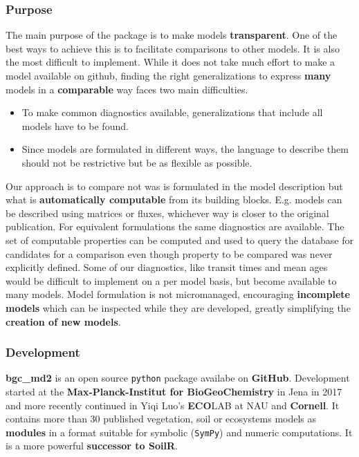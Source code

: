 \documentclass[36pt]{article}
\begin{document}
\begin{tcbposter}
{  \subsubsection*{Purpose}
  The main purpose of the package is to make models
  {\bf transparent}. One of the best ways to achieve this is to facilitate comparisons
  to other models. It is also the most difficult to implement.
  While it does not take much effort to make a model available on github, finding the right
  generalizations to express {\bf many} models in a {\bf comparable} way faces two main difficulties.
  \begin{itemize}
  \item
  To make common diagnostics available, generalizations that include all models have to be found.
  \item
  Since models are formulated in different ways, the language to describe them should 
  not be restrictive but be as flexible as possible.
  \end{itemize}
  
  Our approach is to compare not was is formulated in the model description but what is 
  {\bf automatically computable} from its building blocks. 
  E.g. models can be described using matrices
  or fluxes, whichever way is closer to the original publication.
  For equivalent formulations the same diagnostics are available.
  The set of computable properties can be computed and used to query the database 
  for candidates for a comparison even though property to be compared was never explicitly defined.
  Some of our diagnostics, like transit times and mean ages would be difficult to implement 
  on a per model basis, but become available to many models. 
  Model formulation is not micromanaged, encouraging {\bf incomplete models} which can be inspected while 
  they are developed, greatly simplifying the {\bf creation of new models}.
  
  \subsubsection*{Development}
	{ \bf bgc\_md2 } is an open source \texttt{python} package availabe on { \bf GitHub}.
  Development started at the { \bf Max-Planck-Institut for BioGeoChemistry} in Jena in 2017 and more recently  continued in Yiqi Luo's {\bf ECO}LAB at NAU and {\bf Cornell}.
	It contains more than 30 published vegetation, soil or ecosystems models as {\bf modules}
  in a format suitable for symbolic (\texttt{SymPy}) and numeric computations.
  It is a more powerful {\bf successor to  SoilR}. 

}
\end{tcbposter}
\end{document}
